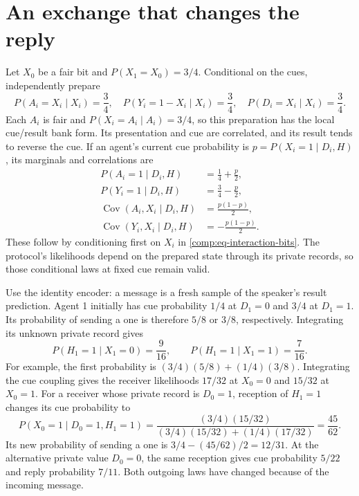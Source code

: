 \section{An exchange that changes the reply}
\label{comp:interaction-example}

Let $X_0$ be a fair bit and $P(X_1=X_0)=3/4$. Conditional on the cues, independently prepare
\begin{equation}
P(A_i=X_i\mid X_i)=\frac34,\quad
P(Y_i=1-X_i\mid X_i)=\frac34,\quad
P(D_i=X_i\mid X_i)=\frac34.
\label{comp:eq-interaction-bits}
\end{equation}
Each $A_i$ is fair and $P(X_i=A_i\mid A_i)=3/4$, so this preparation has the local cue/result bank form. Its presentation and cue are correlated, and its result tends to reverse the cue. If an agent's current cue probability is $p=P(X_i=1\mid D_i,H)$, its marginals and correlations are
\begin{equation}
\begin{aligned}
P(A_i=1\mid D_i,H)&=\frac14+\frac p2,\\
P(Y_i=1\mid D_i,H)&=\frac34-\frac p2,\\
\operatorname{Cov}(A_i,X_i\mid D_i,H)&=\frac{p(1-p)}2,\\
\operatorname{Cov}(Y_i,X_i\mid D_i,H)&=-\frac{p(1-p)}2.
\end{aligned}
\label{comp:eq-interaction-correlations}
\end{equation}
These follow by conditioning first on $X_i$ in \cref{comp:eq-interaction-bits}. The protocol's likelihoods depend on the prepared state through its private records, so those conditional laws at fixed cue remain valid.

Use the identity encoder: a message is a fresh sample of the speaker's result prediction. Agent 1 initially has cue probability $1/4$ at $D_1=0$ and $3/4$ at $D_1=1$. Its probability of sending a one is therefore $5/8$ or $3/8$, respectively. Integrating its unknown private record gives
\begin{equation}
P(H_1=1\mid X_1=0)=\frac9{16},\qquad
P(H_1=1\mid X_1=1)=\frac7{16}.
\end{equation}
For example, the first probability is $(3/4)(5/8)+(1/4)(3/8)$. Integrating the cue coupling gives the receiver likelihoods $17/32$ at $X_0=0$ and $15/32$ at $X_0=1$. For a receiver whose private record is $D_0=1$, reception of $H_1=1$ changes its cue probability to
\begin{equation}
P(X_0=1\mid D_0=1,H_1=1)
=\frac{(3/4)(15/32)}{(3/4)(15/32)+(1/4)(17/32)}
=\frac{45}{62}.
\end{equation}
Its new probability of sending a one is $3/4-(45/62)/2=12/31$. At the alternative private value $D_0=0$, the same reception gives cue probability $5/22$ and reply probability $7/11$. Both outgoing laws have changed because of the incoming message.

